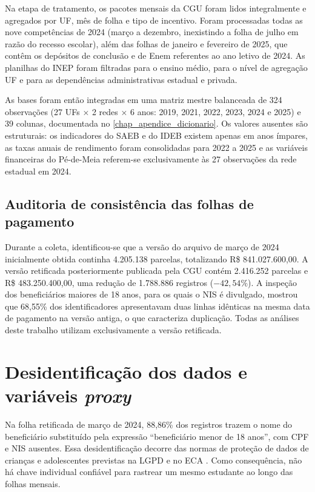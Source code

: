 Na etapa de tratamento, os pacotes mensais da CGU foram lidos integralmente e agregados por UF, mês de folha e tipo de incentivo.
Foram processadas todas as nove competências de 2024 (março a dezembro, inexistindo a folha de julho em razão do recesso escolar), além das folhas de janeiro e fevereiro de 2025, que contêm os depósitos de conclusão e de Enem referentes ao ano letivo de 2024.
As planilhas do INEP foram filtradas para o ensino médio, para o nível de agregação UF e para as dependências administrativas estadual e privada.

As bases foram então integradas em uma matriz mestre balanceada de 324 observações (27 UFs $\times$ 2 redes $\times$ 6 anos: 2019, 2021, 2022, 2023, 2024 e 2025) e 39 colunas, documentada no \autoref{chap_apendice_dicionario}.
Os valores ausentes são estruturais: os indicadores do SAEB e do IDEB existem apenas em anos ímpares, as taxas anuais de rendimento foram consolidadas para 2022 a 2025 e as variáveis financeiras do Pé-de-Meia referem-se exclusivamente às 27 observações da rede estadual em 2024.

\subsection{Auditoria de consistência das folhas de pagamento}
\label{subsec_auditoria}

Durante a coleta, identificou-se que a versão do arquivo de março de 2024 inicialmente obtida continha 4.205.138 parcelas, totalizando R\$ 841.027.600,00.
A versão retificada posteriormente publicada pela CGU contém 2.416.252 parcelas e R\$ 483.250.400,00, uma redução de 1.788.886 registros ($-42{,}54\%$).
A inspeção dos beneficiários maiores de 18 anos, para os quais o NIS é divulgado, mostrou que 68,55\% dos identificadores apresentavam duas linhas idênticas na mesma data de pagamento na versão antiga, o que caracteriza duplicação.
Todas as análises deste trabalho utilizam exclusivamente a versão retificada.

\section{Desidentificação dos dados e variáveis \textit{proxy}}
\label{sec_desidentificacao}

Na folha retificada de março de 2024, 88,86\% dos registros trazem o nome do beneficiário substituído pela expressão ``beneficiário menor de 18 anos'', com CPF e NIS ausentes.
Essa desidentificação decorre das normas de proteção de dados de crianças e adolescentes previstas na LGPD \cite{Brasil2018LGPD} e no ECA \cite{Brasil1990ECA}.
Como consequência, não há chave individual confiável para rastrear um mesmo estudante ao longo das folhas mensais.

